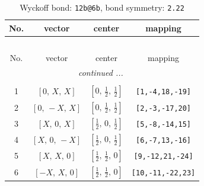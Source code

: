 \documentclass[fleqn,8pt]{jsarticle}
\begin{document}
\renewcommand{\arraystretch}{1.2}
\begin{longtable}{cccc}
\caption{Wyckoff bond: {\tt 12b@6b}, bond symmetry: {\tt 2.22}}
 \\
 \hline \hline
No. & vector & center & mapping \\ \hline \endfirsthead

\multicolumn{3}{l}{\tablename\ \thetable{}} \\
 \hline \hline
No. & vector & center & mapping \\ \hline \endhead

 \hline \hline
\multicolumn{3}{r}{\footnotesize\it continued ...} \\ \endfoot

 \hline \hline
\multicolumn{3}{r}{} \\ \endlastfoot

1 & $\left[ 0,\, X,\, X \right]$ & $\left[ 0,\, \frac{1}{2},\, \frac{1}{2} \right]$ & {\tt [1,-4,18,-19]} \\ \hline
2 & $\left[ 0,\, - X,\, X \right]$ & $\left[ 0,\, \frac{1}{2},\, \frac{1}{2} \right]$ & {\tt [2,-3,-17,20]} \\ \hline
3 & $\left[ X,\, 0,\, X \right]$ & $\left[ \frac{1}{2},\, 0,\, \frac{1}{2} \right]$ & {\tt [5,-8,-14,15]} \\ \hline
4 & $\left[ X,\, 0,\, - X \right]$ & $\left[ \frac{1}{2},\, 0,\, \frac{1}{2} \right]$ & {\tt [6,-7,13,-16]} \\ \hline
5 & $\left[ X,\, X,\, 0 \right]$ & $\left[ \frac{1}{2},\, \frac{1}{2},\, 0 \right]$ & {\tt [9,-12,21,-24]} \\ \hline
6 & $\left[ - X,\, X,\, 0 \right]$ & $\left[ \frac{1}{2},\, \frac{1}{2},\, 0 \right]$ & {\tt [10,-11,-22,23]} \\
\end{longtable}
\renewcommand{\arraystretch}{1.2}
\end{document}
